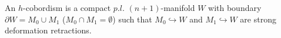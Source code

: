 An $h$-cobordism is a compact $p.l.$ $(n+1)$-manifold $W$ with boundary $\partial W = M_0 \cup M_1$ ($M_0 \cap M_1 = \emptyset$) such that $M_0 \hookrightarrow W$ and $M_1 \hookrightarrow W$ are strong deformation retractions.
